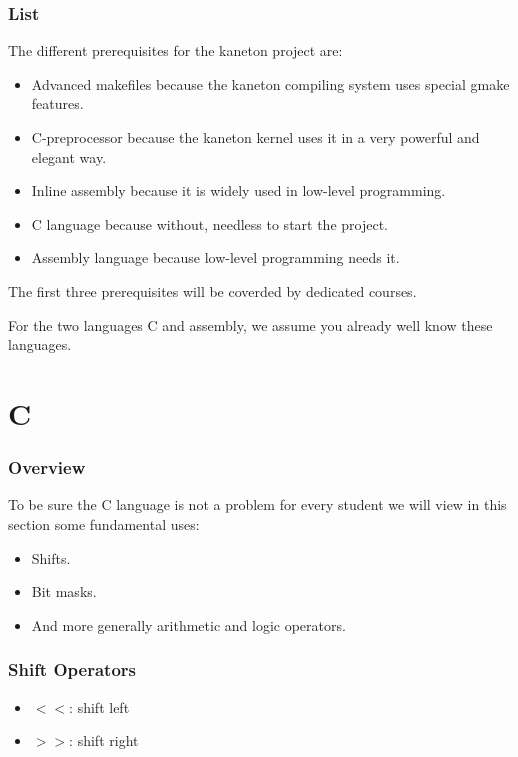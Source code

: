 \begin{frame}
  \frametitle{List}

  The different prerequisites for the kaneton project are:

  \begin{itemize}[<+->]
    \item
      Advanced makefiles because the kaneton compiling system uses special
      gmake features.
    \item
      C-preprocessor because the kaneton kernel uses it in a very powerful
      and elegant way.
    \item
      Inline assembly because it is widely used in low-level programming.
    \item
      C language because without, needless to start the project.
    \item
      Assembly language because low-level programming needs it.
  \end{itemize}

  \nl

  The first three prerequisites will be coverded by dedicated courses.

  \nl

  For the two languages C and assembly, we assume you already well know these
  languages.
\end{frame}

%
%

\section{C}


\begin{frame}
  \frametitle{Overview}

  To be sure the C language is not a problem for every student we
  will view in this section some fundamental uses:

  \begin{itemize}
    \item
      Shifts.
    \item
      Bit masks.
    \item
      And more generally arithmetic and logic operators.
  \end{itemize}
\end{frame}


\begin{frame}
  \frametitle{Shift Operators}

  \begin{itemize}[<+->]
    \item
      $<<$: shift left
    \item
      $>>$: shift right
  \end{itemize}
\end{frame}


